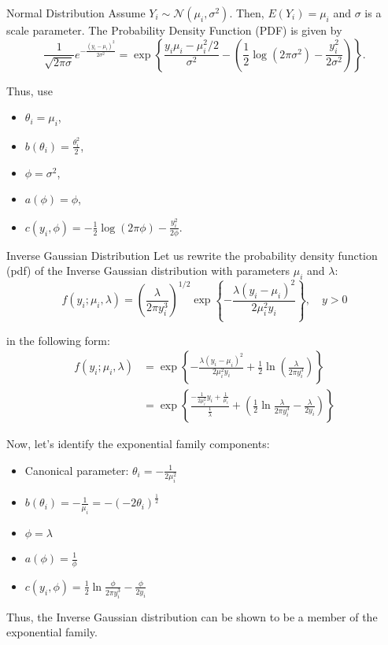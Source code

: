 \documentclass[UTF8,a4paper,10pt]{article}
\begin{document}
  \begin{mybox}{Normal Distribution}
Assume $Y_i \sim \mathcal{N}(\mu_i, \sigma^2)$. Then, $E(Y_i) = \mu_i$ and $\sigma$ is a scale parameter. The Probability Density Function (PDF) is given by
\[
\frac{1}{\sqrt{2\pi\sigma}}e^{-\frac{(y_i - \mu_i)^2}{2\sigma^2}} = \exp\left\{\frac{y_i\mu_i - \mu_i^2/2}{\sigma^2} - \left(\frac{1}{2}\log(2\pi\sigma^2) - \frac{y_i^2}{2\sigma^2}\right)\right\}.
\]

Thus, use 

\begin{itemize}
  \item $\theta_i = \mu_i$,
  \item $b(\theta_i) = \frac{\theta_i^2}{2}$,
  \item $\phi = \sigma^2$, 
  \item $a(\phi) = \phi$,
  \item $c(y_i, \phi) = -\frac{1}{2}\log(2\pi\phi) - \frac{y_i^2}{2\phi}$.
\end{itemize}


\end{mybox}
\pagebreak


\begin{mybox}{Inverse Gaussian Distribution}
  Let us rewrite the probability density function (pdf) of the Inverse Gaussian distribution with parameters $\mu_i$ and $\lambda$:
  \[
  f(y_i; \mu_i, \lambda) = \left(\frac{\lambda}{2\pi y_i^3}\right)^{1/2}\exp\left\{-\frac{\lambda(y_i - \mu_i)^2}{2\mu_i^2 y_i}\right\}, \quad y > 0
  \]
  
  in the following form:
  \[
  \begin{aligned}
  f(y_i; \mu_i, \lambda) &= \exp\left\{-\frac{\lambda(y_i - \mu_i)^2}{2\mu_i^2 y_i} + \frac{1}{2}\ln\left(\frac{\lambda}{2\pi y_i^3}\right)\right\} \\
  &=\exp\left\{\frac{-\frac{1}{2\mu_i^2}y_i+\frac{1}{\mu_i}}{\frac{1}{\lambda}}+\left(\frac{1}{2}\ln \frac{\lambda}{2\pi y_i^3}-\frac{\lambda}{2y_i}\right) \right\}
  \end{aligned}
  \]
  
  Now, let's identify the exponential family components:
  \begin{itemize}
      \item Canonical parameter: $\theta_i = -\frac{1}{2\mu_i^2}$
      \item $b(\theta_i) = -\frac{1}{\mu_i} = -(-2\theta_i)^{\frac{1}{2}} $
      \item $\phi = \lambda$
      \item \(a(\phi) = \frac{1}{\phi}\)
      \item \(c(y_i,\phi) = \frac{1}{2}\ln\frac{\phi}{2\pi y_i^{3}}-\frac{\phi}{2y_i}\)
  \end{itemize}
  
  Thus, the Inverse Gaussian distribution can be shown to be a member of the exponential family.

\end{mybox}
  
\end{document}
